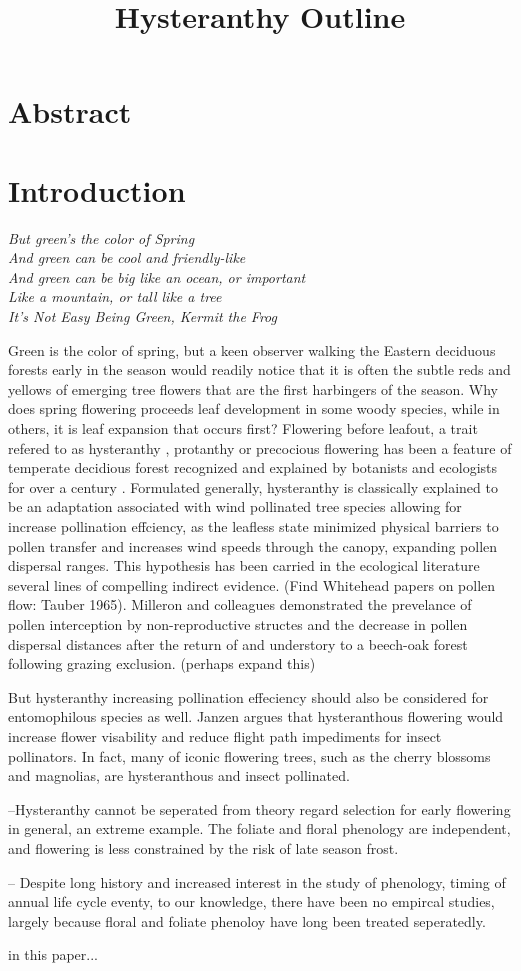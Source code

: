\documentclass{article}\usepackage[]{graphicx}\usepackage[]{color}
\begin{document}
\title{Hysteranthy Outline}

\section{Abstract}
\section{Introduction}
\textit{
But green's the color of Spring\\
And green can be cool and friendly-like\\
And green can be big like an ocean, or important\\
Like a mountain, or tall like a tree}\\
\textit{It's Not Easy Being Green, Kermit the Frog}
\par
Green is the color of spring, but a keen observer walking the Eastern deciduous forests early in the season would readily notice that it is often the subtle reds and yellows of emerging tree flowers that are the first harbingers of the season. Why does spring flowering proceeds leaf development in some woody species, while in others, it is leaf expansion that occurs first? Flowering before leafout, a trait refered to as hysteranthy \citep{}, protanthy \citep{} or precocious flowering \citep{} has been a feature of temperate decidious forest recognized and explained by botanists and ecologists for over a century \citep{}. Formulated generally, hysteranthy is classically explained to be an adaptation associated with wind pollinated tree species allowing for increase pollination effciency\citep{}, as the leafless state minimized physical barriers to pollen transfer \citep{} and increases wind speeds through the canopy, expanding pollen dispersal ranges\citep{}. This hypothesis has been carried in the ecological literature several lines of compelling indirect evidence. (Find Whitehead papers on pollen flow: Tauber 1965). Milleron and colleagues \citeyear{} demonstrated the prevelance of pollen interception by non-reproductive structes and the decrease in pollen dispersal distances after the return of and understory to a beech-oak forest following grazing exclusion. (perhaps expand this)
\par
But hysteranthy increasing pollination effeciency should also be considered for entomophilous species as well. Janzen \citeyear{} argues that hysteranthous flowering would increase flower visability and reduce flight path impediments for insect pollinators. In fact, many of iconic flowering trees, such as the cherry blossoms and magnolias, are hysteranthous and insect pollinated.
\par
--Hysteranthy cannot be seperated from theory regard selection for early flowering in general, an extreme example. The foliate and floral phenology are independent, and flowering is less constrained by the risk of late season frost.
\par
-- Despite long history and increased interest in the study of phenology, timing of annual life cycle eventy,  to our knowledge, there have been no empircal studies, largely because floral and foliate phenoloy have long been treated seperatedly.
\par
in this paper...
\end{document}
